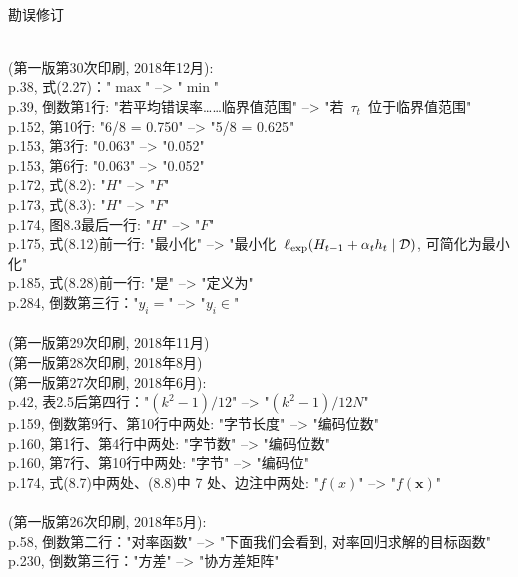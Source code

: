 \documentclass[UTF8]{article}
\begin{document}
\quad\\
勘误修订\quad\\ 

\quad\\
(第一版第30次印刷, 2018年12月):
\\
p.38, 式(2.27)："$\max$" --> "$\min$" \\
p.39, 倒数第1行: "若平均错误率……临界值范围"  --> "若~$\tau_t$~位于临界值范围" \\
p.152, 第10行: "6/8 = 0.750" --> "5/8 = 0.625" \\
p.153, 第3行: "0.063" --> "0.052" \\
p.153, 第6行: "0.063" --> "0.052" \\
p.172, 式(8.2): "$H$" --> "$F$" \\
p.173, 式(8.3): "$H$" --> "$F$" \\
p.174, 图8.3最后一行: "$H$" --> "$F$" \\
p.175, 式(8.12)前一行: "最小化" --> "最小化~$\ell_{\rm exp}(H_{t-1} + \alpha_t h_t \mid \mathcal{D})$, 可简化为最小化" \\
p.185, 式(8.28)前一行: "是" --> "定义为" \\
p.284, 倒数第三行："$y_i =$" --> "$y_i \in$"
\\
\\
(第一版第29次印刷, 2018年11月)
\\
(第一版第28次印刷, 2018年8月)
\\
(第一版第27次印刷, 2018年6月):
\\
p.42, 表2.5后第四行："$(k^2-1)/12$" --> "$(k^2-1)/12N$" \\
p.159, 倒数第9行、第10行中两处: "字节长度" --> "编码位数" \\
p.160, 第1行、第4行中两处: "字节数" --> "编码位数" \\
p.160, 第7行、第10行中两处: "字节" --> "编码位" \\
p.174, 式(8.7)中两处、(8.8)中 7 处、边注中两处: "$f(x)$" --> "$f(\bm{x})$" \\
\\
(第一版第26次印刷, 2018年5月):
\\
p.58, 倒数第二行："对率函数" --> "下面我们会看到, 对率回归求解的目标函数" \\
p.230, 倒数第三行："方差" --> "协方差矩阵" \\
\\
\end{document}
